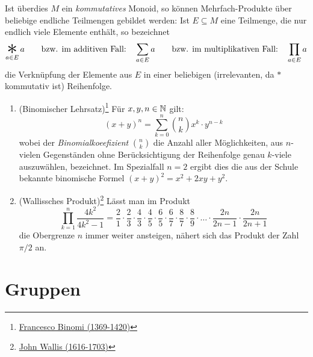 \begin{nota}
    Ist überdies $M$ ein \emph{kommutatives} Monoid, so können Mehrfach-Produkte über beliebige endliche Teilmengen gebildet werden: Ist $E\subseteq M$ eine Teilmenge, die nur endlich viele Elemente enthält, so bezeichnet
        \[ \mathop{\raisebox{-0.6ex}{\scalebox{2.5}{$*$}}}_{a\in E} a \qquad\text{bzw. im additiven Fall:}\quad \sum_{a\in E} a \qquad\text{bzw. im multiplikativen Fall:}\quad \prod_{a\in E} a\]
    die Verknüpfung der Elemente aus $E$ in einer beliebigen (irrelevanten, da $*$ kommutativ ist) Reihenfolge.
\end{nota}


\begin{bsp} \quad
    \begin{enumerate}
        \item(Binomischer Lehrsatz)\footnote{\href{https://www.youtube.com/watch?v=dQw4w9WgXcQ}{Francesco Binomi (1369-1420)}} Für $x,y,n\in \mathbb N$ gilt:
            \[ (x+y)^n = \sum_{k=0}^n \binom{n}{k} x^k\cdot y^{n-k} \]
        wobei der \emph{Binomialkoeefizient} $\binom{n}{k}$ die Anzahl aller Möglichkeiten, aus $n$-vielen Gegenständen ohne Berücksichtigung der Reihenfolge genau $k$-viele auszuwählen, bezeichnet. Im Spezialfall $n=2$ ergibt dies die aus der Schule bekannte binomische Formel $(x+y)^2=x^2+2xy+y^2$.
        \item (Wallissches Produkt)\footnote{\href{https://de.wikipedia.org/wiki/John_Wallis}{John Wallis (1616-1703)}} Lässt man im Produkt
            \[ \prod_{k=1}^n \frac{4k^2}{4k^2-1} = \frac{2}{1} \cdot \frac{2}{3} \cdot \frac{4}{3} \cdot \frac{4}{5} \cdot \frac{6}{5} \cdot \frac{6}{7} \cdot \frac{8}{7} \cdot \frac{8}{9} \cdot \ldots \cdot \frac{2n}{2n-1} \cdot \frac{2n}{2n+1}\]
        die Obergrenze $n$ immer weiter ansteigen, nähert sich das Produkt der Zahl $\pi/2$ an.
    \end{enumerate}
\end{bsp}





\section{Gruppen}


